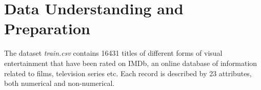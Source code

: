 \chapter{Data Understanding and Preparation}
\label{ch:capitolo1}

The dataset \textit{train.csv} contains 16431 titles of different forms of visual entertainment that have been rated on IMDb, 
an online database of information related to films, television series etc. 
Each record is described by 23 attributes, both numerical and non-numerical. 




